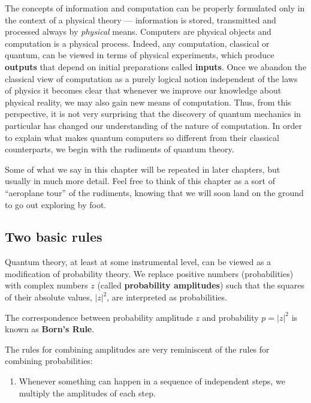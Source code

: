 \documentclass[fleqn]{article}
\providecommand{\tightlist}{%
  \setlength{\itemsep}{0pt}\setlength{\parskip}{0pt}}
\newenvironment{idea}{\noindent}{\medskip}
\begin{document}
The concepts of information and computation can be properly formulated only in the context of a physical theory --- information is stored, transmitted and processed always by \emph{physical} means.
Computers are physical objects and computation is a physical process.
Indeed, any computation, classical or quantum, can be viewed in terms of physical experiments, which produce \textbf{outputs} that depend on initial preparations called \textbf{inputs}.
Once we abandon the classical view of computation as a purely logical notion independent of the laws of physics it becomes clear that whenever we improve our knowledge about physical reality, we may also gain new means of computation.
Thus, from this perspective, it is not very surprising that the discovery of quantum mechanics in particular has changed our understanding of the nature of computation.
In order to explain what makes quantum computers so different from their classical counterparts, we begin with the rudiments of quantum theory.

Some of what we say in this chapter will be repeated in later chapters, but usually in much more detail.
Feel free to think of this chapter as a sort of ``aeroplane tour'' of the rudiments, knowing that we will soon land on the ground to go out exploring by foot.

\hypertarget{two-basic-rules}{%
\subsection{Two basic rules}\label{two-basic-rules}}

Quantum theory, at least at some instrumental level, can be viewed as a modification of probability theory.
We replace positive numbers (probabilities) with complex numbers \(z\) (called \textbf{probability amplitudes}) such that the squares of their absolute values, \(|z|^2\), are interpreted as probabilities.

\begin{idea}

The correspondence between probability amplitude \(z\) and probability \(p=|z|^2\) is known as \textbf{Born's Rule}.

\end{idea}

The rules for combining amplitudes are very reminiscent of the rules for combining probabilities:

\begin{enumerate}
\def\labelenumi{\arabic{enumi}.}
\tightlist
\item
  Whenever something can happen in a sequence of independent steps, we multiply the amplitudes of each step.
\end{enumerate}
\end{document}
